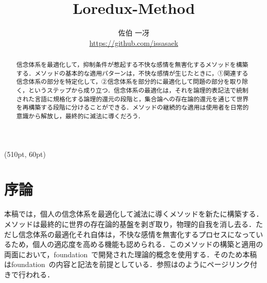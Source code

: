 
\begin{textblock*}{0.1\linewidth}(510pt, 60pt)
    \small \version
\end{textblock*}

\title{Loredux-Method}
\author{佐伯 一冴\\\small\url{https://github.com/issasaek}}
\date{}
\maketitle

\begin{abstract}
    信念体系を最適化して，抑制条件が惹起する不快な感情を無害化するメソッドを構築する．メソッドの基本的な適用パターンは，不快な感情が生じたときに，①関連する信念体系の部分を特定化して，②信念体系を部分的に最適化して問題の部分を取り除く，というステップから成り立つ．信念体系の最適化は，それを論理的表記法で統制された言語に規格化する論理的還元の段階と，集合論への存在論的還元を通じて世界を再構築する段階に分けることができる．メソッドの継続的な適用は使用者を日常的意識から解放し，最終的に滅法に導くだろう．
\end{abstract}

\section{序論}
\label{sec:序論}

本稿では，個人の信念体系を最適化して滅法に導くメソッドを新たに構築する．メソッドは最終的に世界の存在論的基盤を剥ぎ取り，物理的自我を消し去る．ただし信念体系の最適化それ自体は，不快な感情を無害化するプロセスになっているため，個人の適応度を高める機能も認められる．このメソッドの構築と適用の両面において，foundation~\cite{foundation}で開発された理論的概念を使用する．そのため本稿はfoundation~\cite{foundation}の内容と記法を前提としている．参照はのようにページリンク付きで行われる．

